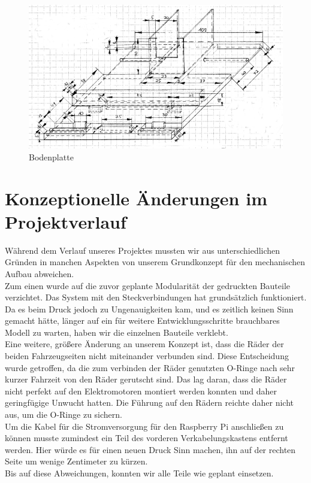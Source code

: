 \begin{figure}
	\includegraphics[width=14.5cm,angle=0]{content/pictures/bodenplatte.png}
	\caption{Bodenplatte}
	\label{fig:bodenplatte}
\end{figure}

\vspace{9cm}
\section{Konzeptionelle Änderungen im Projektverlauf}
Während dem Verlauf unseres Projektes mussten wir aus unterschiedlichen Gründen in manchen Aspekten von unserem Grundkonzept für den mechanischen Aufbau abweichen.\\
Zum einen wurde auf die zuvor geplante Modularität der gedruckten Bauteile verzichtet. Das System mit den Steckverbindungen hat grundsätzlich funktioniert. Da es beim Druck jedoch zu Ungenauigkeiten kam, und es zeitlich keinen Sinn gemacht hätte, länger auf ein für weitere Entwicklungsschritte brauchbares Modell zu warten, haben wir die einzelnen Bauteile verklebt.\\
Eine weitere, größere Änderung an unserem Konzept ist, dass die Räder der beiden Fahrzeugseiten nicht miteinander verbunden sind. Diese Entscheidung wurde getroffen, da die zum verbinden der Räder genutzten O-Ringe nach sehr kurzer Fahrzeit von den Räder gerutscht sind. Das lag daran, dass die Räder nicht perfekt auf den Elektromotoren montiert werden konnten und daher geringfügige Unwucht hatten. Die Führung auf den Rädern reichte daher nicht aus, um die O-Ringe zu sichern.\\
Um die Kabel für die Stromversorgung für den Raspberry Pi anschließen zu können musste zumindest ein Teil des vorderen Verkabelungskastens entfernt werden. Hier würde es für einen neuen Druck Sinn machen, ihn auf der rechten Seite um wenige Zentimeter zu kürzen.\\
Bis auf diese Abweichungen, konnten wir alle Teile wie geplant einsetzen.


